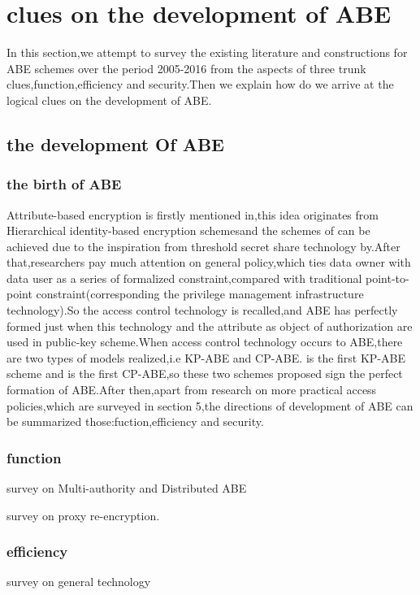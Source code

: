 \section{clues on the development of ABE}
In this section,we attempt to survey the existing literature and constructions for ABE schemes over the period 2005-2016 from the aspects of three trunk clues,function,efficiency and security.Then we explain how do we arrive at the logical clues on the development of ABE.
\subsection{the development Of ABE}
\subsubsection{the birth of ABE}Attribute-based encryption is firstly mentioned in\cite{fuzz},this idea originates from Hierarchical identity-based encryption schemes\cite{Yao:Id-based encryption for complex hierarchies with applications to forward security and broadcast encryption}and the schemes of \cite{fuzz} can be achieved due to the inspiration from threshold secret share technology by\cite{ Adi Shamir:How to Share a Secret}.After that,researchers pay much attention on general policy,which ties data owner with data user as a series of formalized constraint,compared with traditional point-to-point constraint(corresponding the privilege management infrastructure technology).So the access control technology is recalled,and ABE has perfectly formed just when this technology and the attribute as object of authorization are used in public-key scheme.When access control technology occurs to ABE,there are two types of models realized,i.e KP-ABE and CP-ABE.\cite{classical:KP-ABE} is the first KP-ABE scheme and \cite{first:CP-ABE} is the first CP-ABE,so these two schemes proposed sign the perfect formation of ABE.After then,apart from research on more practical access policies,which are surveyed in section 5,the directions of development of ABE can be summarized those:fuction,efficiency and security.
\subsubsection{function}
survey on Multi-authority and Distributed ABE

survey on proxy re-encryption. 
\subsubsection{efficiency}
survey on general technology

